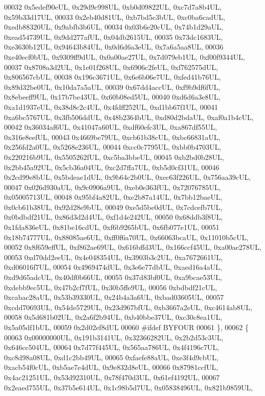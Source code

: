 \begin{DoxyCode}
00032     0x5edef90eUL, 0x29d9c998UL, 0xb0d09822UL, 0xc7d7a8b4UL, 0x59b33d17UL,
00033     0x2eb40d81UL, 0xb7bd5c3bUL, 0xc0ba6cadUL, 0xedb88320UL, 0x9abfb3b6UL,
00034     0x03b6e20cUL, 0x74b1d29aUL, 0xead54739UL, 0x9dd277afUL, 0x04db2615UL,
00035     0x73dc1683UL, 0xe3630b12UL, 0x94643b84UL, 0x0d6d6a3eUL, 0x7a6a5aa8UL,
00036     0xe40ecf0bUL, 0x9309ff9dUL, 0x0a00ae27UL, 0x7d079eb1UL, 0xf00f9344UL,
00037     0x8708a3d2UL, 0x1e01f268UL, 0x6906c2feUL, 0xf762575dUL, 0x806567cbUL,
00038     0x196c3671UL, 0x6e6b06e7UL, 0xfed41b76UL, 0x89d32be0UL, 0x10da7a5aUL,
00039     0x67dd4accUL, 0xf9b9df6fUL, 0x8ebeeff9UL, 0x17b7be43UL, 0x60b08ed5UL,
00040     0xd6d6a3e8UL, 0xa1d1937eUL, 0x38d8c2c4UL, 0x4fdff252UL, 0xd1bb67f1UL,
00041     0xa6bc5767UL, 0x3fb506ddUL, 0x48b2364bUL, 0xd80d2bdaUL, 0xaf0a1b4cUL,
00042     0x36034af6UL, 0x41047a60UL, 0xdf60efc3UL, 0xa867df55UL, 0x316e8eefUL,
00043     0x4669be79UL, 0xcb61b38cUL, 0xbc66831aUL, 0x256fd2a0UL, 0x5268e236UL,
00044     0xcc0c7795UL, 0xbb0b4703UL, 0x220216b9UL, 0x5505262fUL, 0xc5ba3bbeUL,
00045     0xb2bd0b28UL, 0x2bb45a92UL, 0x5cb36a04UL, 0xc2d7ffa7UL, 0xb5d0cf31UL,
00046     0x2cd99e8bUL, 0x5bdeae1dUL, 0x9b64c2b0UL, 0xec63f226UL, 0x756aa39cUL,
00047     0x026d930aUL, 0x9c0906a9UL, 0xeb0e363fUL, 0x72076785UL, 0x05005713UL,
00048     0x95bf4a82UL, 0xe2b87a14UL, 0x7bb12baeUL, 0x0cb61b38UL, 0x92d28e9bUL,
00049     0xe5d5be0dUL, 0x7cdcefb7UL, 0x0bdbdf21UL, 0x86d3d2d4UL, 0xf1d4e242UL,
00050     0x68ddb3f8UL, 0x1fda836eUL, 0x81be16cdUL, 0xf6b9265bUL, 0x6fb077e1UL,
00051     0x18b74777UL, 0x88085ae6UL, 0xff0f6a70UL, 0x66063bcaUL, 0x11010b5cUL,
00052     0x8f659effUL, 0xf862ae69UL, 0x616bffd3UL, 0x166ccf45UL, 0xa00ae278UL,
00053     0xd70dd2eeUL, 0x4e048354UL, 0x3903b3c2UL, 0xa7672661UL, 0xd06016f7UL,
00054     0x4969474dUL, 0x3e6e77dbUL, 0xaed16a4aUL, 0xd9d65adcUL, 0x40df0b66UL,
00055     0x37d83bf0UL, 0xa9bcae53UL, 0xdebb9ec5UL, 0x47b2cf7fUL, 0x30b5ffe9UL,
00056     0xbdbdf21cUL, 0xcabac28aUL, 0x53b39330UL, 0x24b4a3a6UL, 0xbad03605UL,
00057     0xcdd70693UL, 0x54de5729UL, 0x23d967bfUL, 0xb3667a2eUL, 0xc4614ab8UL,
00058     0x5d681b02UL, 0x2a6f2b94UL, 0xb40bbe37UL, 0xc30c8ea1UL, 0x5a05df1bUL,
00059     0x2d02ef8dUL
00060 \textcolor{preprocessor}{#ifdef BYFOUR}
00061   \},
00062   \{
00063     0x00000000UL, 0x191b3141UL, 0x32366282UL, 0x2b2d53c3UL, 0x646cc504UL,
00064     0x7d77f445UL, 0x565aa786UL, 0x4f4196c7UL, 0xc8d98a08UL, 0xd1c2bb49UL,
00065     0xfaefe88aUL, 0xe3f4d9cbUL, 0xacb54f0cUL, 0xb5ae7e4dUL, 0x9e832d8eUL,
00066     0x87981ccfUL, 0x4ac21251UL, 0x53d92310UL, 0x78f470d3UL, 0x61ef4192UL,
00067     0x2eaed755UL, 0x37b5e614UL, 0x1c98b5d7UL, 0x05838496UL, 0x821b9859UL,

\end{DoxyCode}
